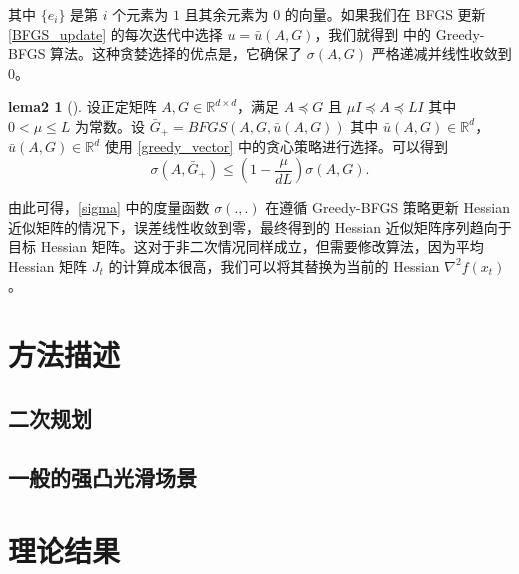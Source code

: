 \documentclass[a4paper,twoside,AutoFakeBold]{article}
\theoremstyle{definition}
\newtheorem{lema2}{{lema2}}
\begin{document}
其中 $\{e_i\}$ 是第 $i$ 个元素为 $1$ 且其余元素为 $0$ 的向量。如果我们在 BFGS 更新 \eqref{BFGS_update} 的每次迭代中选择 $u = \bar{u}(A, G)$，我们就得到 \cite{rodomanov2020greedy} 中的 Greedy-BFGS 算法。这种贪婪选择的优点是，它确保了 $\sigma(A, G)$ 严格递减并线性收敛到 $0$。

\begin{lema2}[\cite{rodomanov2020greedy}]\label{lema2_BFGS_greedy}
    设正定矩阵 $A, G \in \mathbb{R}^{d \times d}$，满足 $A \preceq G$ 且 $ \mu I \preceq A \preceq LI$ 其中 $0 < \mu \leq L$ 为常数。设 $\bar{G}_{+} = BFGS(A, G, \bar{u}(A, G))$ 其中 $\bar{u}(A, G) \in \mathbb{R}^d$，$\bar{u}(A, G) \in \mathbb{R}^d$ 使用 \eqref{greedy_vector} 中的贪心策略进行选择。可以得到
    \begin{equation}\label{lema2_BFGS_greedy_1}
        \sigma(A, \bar{G}_{+}) \leq \left(1 - \frac{\mu}{dL}\right)\sigma(A, G).
    \end{equation}
\end{lema2}

由此可得，\eqref{sigma} 中的度量函数 $\sigma(.,.)$ 在遵循 Greedy-BFGS 策略更新 Hessian 近似矩阵的情况下，误差线性收敛到零，最终得到的 Hessian 近似矩阵序列趋向于目标 Hessian 矩阵。这对于非二次情况同样成立，但需要修改算法，因为平均 Hessian 矩阵 $J_t$ 的计算成本很高，我们可以将其替换为当前的 Hessian $\nabla^2 f(x_t)$。

%
\section{方法描述}\label{section:methods}

\subsection{二次规划}

\subsection{一般的强凸光滑场景}


%
\section{理论结果}\label{section:theory}
\end{document}

